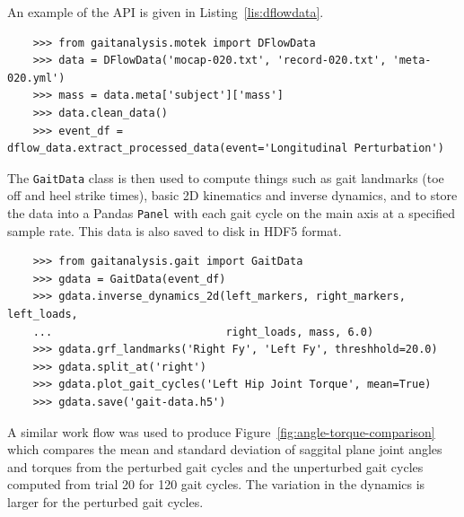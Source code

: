 \documentclass[10pt,a4paper,twocolumn]{article}
\begin{document}
An example of the API is given in Listing~\ref{lis:dflowdata}.

\begin{listing*}
  \begin{verbatim}
    >>> from gaitanalysis.motek import DFlowData
    >>> data = DFlowData('mocap-020.txt', 'record-020.txt', 'meta-020.yml')
    >>> mass = data.meta['subject']['mass']
    >>> data.clean_data()
    >>> event_df = dflow_data.extract_processed_data(event='Longitudinal Perturbation')
  \end{verbatim}
  \cprotect\caption{Python interpreter session showing how one could load a
    trial into memory, extract the subject's mass from the meta data, run the
    data cleaning process, and finally extract a Pandas \verb|DataFrame|
    containing all of the time histories for a specific event in the trial.}
  \label{lis:dflowdata}
\end{listing*}

The \verb|GaitData| class is then used to compute things such as gait landmarks
(toe off and heel strike times), basic 2D kinematics and inverse dynamics, and to store the
data into a Pandas \verb|Panel| with each gait cycle on the main axis at a
specified sample rate. This data is also saved to disk in HDF5 format.

\begin{listing*}
  \begin{verbatim}
    >>> from gaitanalysis.gait import GaitData
    >>> gdata = GaitData(event_df)
    >>> gdata.inverse_dynamics_2d(left_markers, right_markers, left_loads,
    ...                           right_loads, mass, 6.0)
    >>> gdata.grf_landmarks('Right Fy', 'Left Fy', threshhold=20.0)
    >>> gdata.split_at('right')
    >>> gdata.plot_gait_cycles('Left Hip Joint Torque', mean=True)
    >>> gdata.save('gait-data.h5')
  \end{verbatim}
  \cprotect\caption{Python interpreter session showing how one could compute
    the inverse dynamics (joint angles and torques), identify the gait
    landmarks (e.g. heel strikes), split the data with respect to the gait
    landmarks in a Pandas \verb|Panel|, plot the mean and standard deviation of
    one time history with respect to the gait cycles, and save the data to disk.}
  \label{lis:dflowdata}
\end{listing*}

A similar work flow was used to produce Figure~\ref{fig:angle-torque-comparison}
which compares the mean and standard deviation of saggital plane joint angles
and torques from the perturbed gait cycles and the unperturbed gait cycles
computed from trial 20 for 120 gait cycles. The variation in the dynamics is
larger for the perturbed gait cycles.
\end{document}
